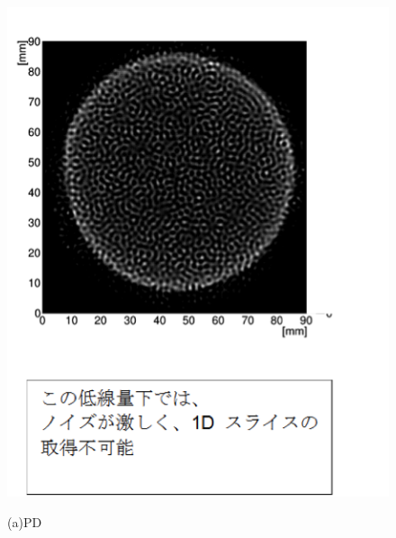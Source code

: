 \begin{figure}[H]
 \begin{minipage}{0.52\hsize}
  \begin{center}
   \includegraphics[bb=0.000000 0.000000 212.142463 271.657543,width=1.01\hsize]{image2/chapter5/spatial_PD.png}
  \end{center}
  \vspace{-0.0cm}\hspace{3.5cm}
   (a)PD
 \end{minipage}
 \begin{minipage}{0.52\hsize}
  \begin{center}

\end{center}
\end{minipage}
\end{figure}
